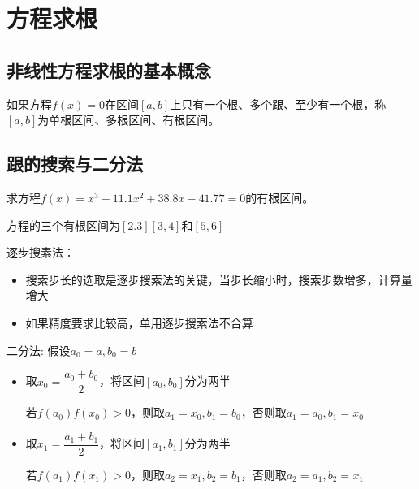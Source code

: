 \section{方程求根}
\subsection{非线性方程求根的基本概念}
\begin{definition}
    如果方程$f(x) = 0$在区间$[a,b]$上只有一个根、多个跟、至少有一个根，称$[a,b]$为单根区间、多根区间、有根区间。
\end{definition}
\subsection{跟的搜索与二分法}
\begin{example}
    求方程$ f(x)=x^3-11.1x^2 +38.8x-41.77=0$的有根区间。
    \begin{solution}
        方程的三个有根区间为$[2.3]$$[3,4]$和$[5,6]$
    \end{solution}
\end{example}
\begin{note}
    逐步搜素法：
    \begin{itemize}
        \item 搜索步长的选取是逐步搜索法的关键，当步长缩小时，搜索步数增多，计算量增大
        \item 如果精度要求比较高，单用逐步搜索法不合算
    \end{itemize}
\end{note}
\begin{note}
    二分法:
    假设$a_0 = a,b_0 = b$
    \begin{itemize}
        \item 取$x_0 = \dfrac{a_0+b_0}{2}$，将区间$[a_0,b_0]$分为两半
    
        若$f(a_0)f(x_0)>0$，则取$a_1 = x_0,b_1 = b_0$，否则取$a_1 = a_0,b_1 = x_0$
        \item 取$x_1 = \dfrac{a_1+b_1}{2}$，将区间$[a_1,b_1]$分为两半
    
        若$f(a_1)f(x_1)>0$，则取$a_2 = x_1,b_2 = b_1$，否则取$a_2 = a_1,b_2 = x_1$
    \end{itemize}
\end{note}
